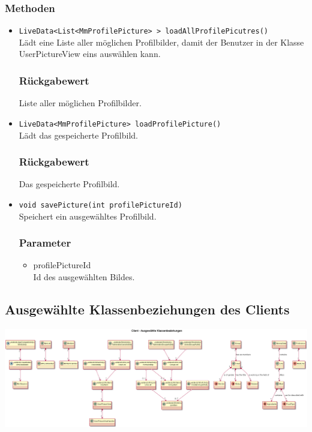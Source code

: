 \documentclass[a4paper]{scrreprt}
\begin{document}
\subsubsection*{Methoden}
\begin{addmargin}[25pt]{0pt}
\begin{itemize}

\item \texttt{LiveData<List<MmProfilePicture> > loadAllProfilePicutres()}\\
	Lädt eine Liste aller möglichen Profilbilder, damit der Benutzer in der Klasse UserPictureView eins auswählen kann.

  \subsubsection*{Rückgabewert}
	Liste aller möglichen Profilbilder.

\item \texttt{LiveData<MmProfilePicture> loadProfilePicture()}\\
	Lädt das gespeicherte Profilbild.

  \subsubsection*{Rückgabewert}
	Das gespeicherte Profilbild.

\item \texttt{void savePicture(int profilePictureId)}\\
Speichert ein ausgewähltes Profilbild.
	\subsubsection*{Parameter}
	\begin{itemize}
	\item profilePictureId \\
	Id des ausgewählten Bildes.
	\end{itemize}

\end{itemize}
\end{addmargin}

\newpage
\subsection{Ausgewählte Klassenbeziehungen des Clients}
\begin{center}
	\includegraphics[width=1.1\textwidth]{GUI/frontend_beziehungen.png}
\end{center} 
\end{document}
